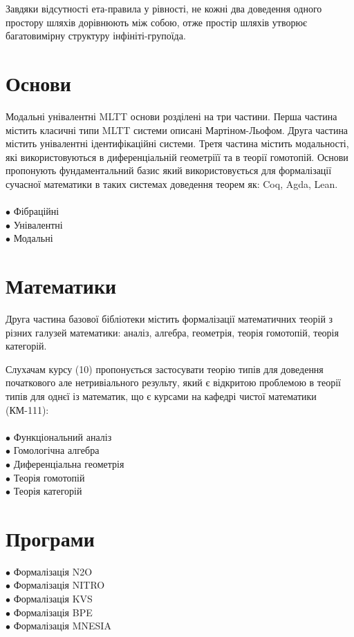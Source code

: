 \documentclass{article}
\theoremstyle{definition}
\begin{document}
Завдяки відсутності ета-правила у рівності, не кожні два
доведення одного простору шляхів дорівнюють між собою, отже
простір шляхів утворює багатовимірну структуру інфініті-групоїда.

\newpage
\section*{Основи}

Модальні унівалентні MLTT основи розділені на три частини.
Перша частина містить класичні типи MLTT системи описані
Мартіном-Льофом. Друга частина містить унівалентні ідентифікаційні
системи. Третя частина містить модальності, які використовуються
в диференціальній геометріїї та в теорії гомотопій. Основи
пропонують фундаментальний базис який використовується для
формалізації сучасної математики в таких системах доведення
теорем як: Coq, Agda, Lean.\\
\\
\noindent
$\bullet$ Фібраційні \\
$\bullet$ Унівалентні \\
$\bullet$ Модальні

\section*{Математики}

Друга частина базової бібліотеки містить формалізації математичних
теорій з різних галузей математики: аналіз, алгебра, геометрія,
теорія гомотопій, теорія категорій.

Слухачам курсу (10) пропонується застосувати теорію типів для
доведення початкового але нетривіального результу, який є
відкритою проблемою в теорії типів для однєї із математик,
що є курсами на кафедрі чистої математики (КМ-111):\\
\\
\noindent
$\bullet$ Функціональний аналіз \\
$\bullet$ Гомологічна алгебра \\
$\bullet$ Диференціальна геометрія \\
$\bullet$ Теорія гомотопій \\
$\bullet$ Теорія категорій \\

\section*{Програми}

\noindent $\bullet$ Формалізація N2O \\
$\bullet$ Формалізація NITRO \\
$\bullet$ Формалізація KVS \\
$\bullet$ Формалізація BPE\ \\
$\bullet$ Формалізація MNESIA\ \\
\end{document}
